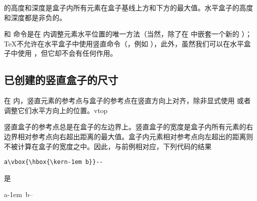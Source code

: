 \documentclass{book}
\begin{document}
 的高度和深度是盒子内所有元素在盒子基线上方和下方的最大值。水平盒子的高度和深度都是非负的。

 和  命令是在  内调整元素水平位置的唯一方法（当然，除了在  中嵌套一个新的 ）；\TeX 不允许在水平盒子中使用竖直命令（，例如 ），此外，虽然我们可以在水平盒子中使用 ，但它却不会有任何作用。

\subsection{已创建的竖直盒子的尺寸}

在  内，竖直元素的参考点与盒子的参考点在竖直方向上对齐，除非显式使用  或者  调整它们水平方向上的位置。\cstoidx vtop\par

竖直盒子的参考点总是在盒子的左边界上。竖直盒子的宽度是盒子内所有元素的右边界相对参考点向右超出距离的最大值。盒子内元素相对参考点向左超出的距离则不被计算在盒子的宽度之中。因此，与前例相对应，下列代码的结果
\begin{disp}\verb>a\vbox{\hbox{\kern-1em b}}-->\end{disp}
是
\begin{disp}\leavevmode\hphantom{b}a\vbox{\hbox{\kern-1em b}}--\end{disp}
\end{document}

